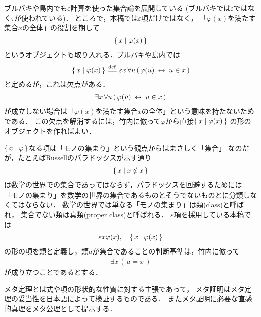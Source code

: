 	ブルバキ\cite{key5}や島内\cite{key6}でも$\varepsilon$計算を使った集合論を展開している
	(ブルバキ\cite{key5}では$\varepsilon$ではなく$\tau$が使われている)．
	ところで，本稿では$\varepsilon$項だけではなく，
	「$\varphi(x)$を満たす集合$x$の全体」の役割を期して
	\begin{align}
		\{\, x \mid \varphi(x)\, \}
	\end{align}
	というオブジェクトも取り入れる．ブルバキ\cite{key5}や島内\cite{key6}では
	\begin{align}
		\Set{x}{\varphi(x)} \defeq \varepsilon x\, \forall u\, 
		(\, \varphi(u) \lrarrow u \in x\, )
	\end{align}
	と定めるが，これは欠点がある．
	\begin{align}
		\exists x\, \forall u\, (\, \varphi(u) \hspace{0.25em}\leftrightarrow\hspace{0.25em} u \in x\, )
	\end{align}
	が成立しない場合は「$\varphi(x)$を満たす集合$x$の全体」という意味を持たないためである．
	この欠点を解消するには，竹内\cite{key4}に倣って$\varphi$から直接$\{\, x \mid \varphi(x)\, \}$
	の形のオブジェクトを作ればよい．
	
	$\{\, x \mid \varphi\, \}$なる項は「モノの集まり」という観点からはまさしく「集合」
	なのだが，たとえばRussellのパラドックスが示す通り
	\begin{align}
		\{\, x \mid x \notin x\, \}
	\end{align}
	は数学の世界での集合であってはならず，パラドックスを回避するためには
	「モノの集まり」を数学の世界の集合であるものとそうでないものとに分類しなくてはならない．
	数学の世界では単なる「モノの集まり」は類(class)と呼ばれ，
	集合でない類は真類(proper class)と呼ばれる．
	$\varepsilon$項を採用している本稿では
	\begin{align}
		\varepsilon x \varphi(x),\quad \{\, x \mid \varphi(x)\, \}
	\end{align}
	の形の項を類と定義し，類$a$が集合であることの判断基準は，竹内\cite{key4}に倣って
	\begin{align}
		\exists x\, (\, a = x\, )
	\end{align}
	が成り立つことであるとする．
	
	メタ定理とは式や項の形状的な性質に対する主張であって，
	メタ証明はメタ定理の妥当性を日本語によって検証するものである．
	またメタ証明に必要な直感的真理をメタ公理として提示する．
	
